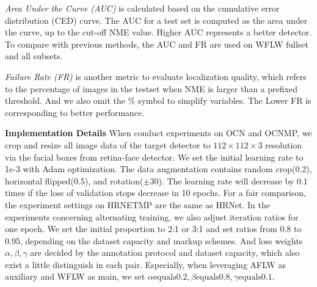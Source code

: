 \documentclass[journal,transmag]{IEEEtran}
\begin{document}
\emph{Area Under the Curve (AUC)} is calculated based on the cumulative error distribution (CED) curve.
The AUC for a test set is computed as the area under the curve, up to the cut-off NME value.
Higher AUC represents a better detector.
To compare with previous methods, the AUC and FR are used on WFLW fullset and all subsets.

\emph{Failure Rate (FR)} is another metric to evaluate localization quality, which refers to the percentage of images in the testset when NME is larger than a prefixed threshold.
And we also omit the \% symbol to simplify variables.
The Lower FR is corresponding to better performance.


{\bf Implementation Details} 
When conduct experiments on OCN and OCNMP, we crop and resize all image data of the target detector to $112\times 112 \times 3 $ resolution via the facial boxes from retina-face detector\cite{deng2020retinaface}.
We set the initial learning rate to 1e-3 with Adam optimization.
The data augmentation contains random crop(0.2), horizontal flipped(0.5), and rotation($\pm$30).
The learning rate will decrease by 0.1 times if the loss of validation stops decrease in 10 epochs.
For a fair comparison, the experiment settings on HRNETMP are the same as HRNet\cite{HRNET}.
In the experiments concerning alternating training, we also adjust iteration ratios for one epoch.
We set the initial proportion to 2:1 or 3:1 and set ratios from 0.8 to 0.95, depending on the dataset capacity and markup schemes.
And loss weights $\alpha,\beta,\gamma$ are decided by the annotation protocol and dataset capacity, which also exist a little distinguish in each pair.
Especially, when leveraging AFLW as auxiliary and WFLW as main, we set $\alpha \text{equals} 0.2, \beta \text{equals} 0.8 , \gamma \text{equals} 0.1$.



\end{document}
